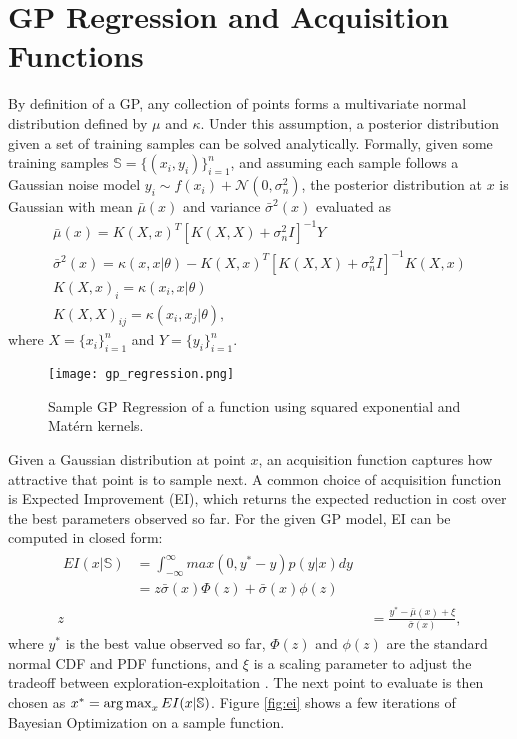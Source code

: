 \section{GP Regression and Acquisition Functions}
\label{gp_acq}
By definition of a GP, any collection of points forms a multivariate normal distribution defined by $\mu$ and $\kappa$. Under this assumption, a posterior distribution given a set of training samples can be solved analytically. Formally, given some training samples $\mathbb{S} = \{(x_i, y_i)\}_{i=1}^n$, and assuming each sample follows a Gaussian noise model $y_i \sim f(x_i) + \mathcal{N}(0, \sigma_n^2)$, the posterior distribution at $x$ is Gaussian with mean $\bar{\mu}(x)$ and variance $\bar{\sigma}^2(x)$ evaluated as
\begin{gather}
  \bar{\mu}(x) = K(X, x)^T[K(X, X) + \sigma_n^2 I]^{-1}Y \\
  \bar{\sigma}^2(x) = \kappa(x, x\vert \theta) - K(X, x)^T[K(X,X) + \sigma_n^2 I]^{-1}K(X,x) \\
  K(X,x)_i = \kappa(x_i, x\vert \theta) \nonumber\\
  K(X,X)_{ij} = \kappa(x_i, x_j\vert \theta) \nonumber,
\end{gather}
where $X = \{x_i\}_{i=1}^n$ and $Y = \{y_i\}_{i=1}^n$. 
\begin{figure}[t]
\centering
\texttt{[image: gp\_regression.png]}
\caption{Sample GP Regression of a function using squared exponential and Matérn kernels.}
\label{fig:gp_regression}
\end{figure}

Given a Gaussian distribution at point $x$, an acquisition function captures how attractive that point is to sample next. A common choice of acquisition function is Expected Improvement (EI), which returns the expected reduction in cost over the best parameters observed so far. For the given GP model, EI can be computed in closed form: 
\begin{align}
  \begin{split}
  EI(x\vert \mathbb{S}) &= \int_{-\infty}^\infty max(0, y^*-y)p(y\vert x)dy\\
    &= z\bar{\sigma}(x)\Phi(z) + \bar{\sigma}(x)\phi(z)
  \end{split}\\
  z &= \frac{y^* - \bar{\mu}(x) + \xi}{\bar{\sigma}(x)}\nonumber,
\end{align}
where $y^*$ is the best value observed so far, $\Phi(z)$ and $\phi(z)$ are the standard normal CDF and PDF functions, and $\xi$ is a scaling parameter to adjust the tradeoff between exploration-exploitation \citep{Lizotte:2008:PBO:1626686}. The next point to evaluate is then chosen as $x^* = \operatorname*{arg\,max}_{x} EI(x \vert \mathbb{S})$. Figure \ref{fig:ei} shows a few iterations of Bayesian Optimization on a sample function.

